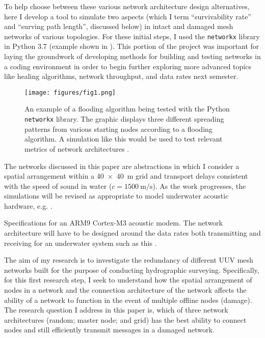 \documentclass[twocolumn,10pt]{IEEEtran}
\begin{document}
To help choose between these various network architecture design alternatives, here I develop a tool to simulate two aspects (which I term ``survivability rate'' and ``surving path length'', discussed below) in intact and damaged mesh networks of various topologies. For these initial steps, I used the \lstinline{networkx} library \cite{hagberg2008exploring, sphyce2015networkx} in Python 3.7 (example shown in ).  This portion of the project was important for laying the groundwork of developing methods for building and testing networks in a coding environment in order to begin further exploring more advanced topics like healing algorithms, network throughput, and data rates next semester. 
\begin{figure}[h]
\begin{center}
\texttt{[image: figures/fig1.png]}
\end{center}
\caption{An example of a flooding algorithm being tested with the Python \lstinline{networkx} library. The graphic displays three different spreading patterns from various starting nodes according to a flooding algorithm. A simulation like this would be used to test relevant metrics of network architectures \cite{sphyce2015networkx}.}
\label{fig:2}
\end{figure}

The networks discussed in this paper are abstractions in which I consider a spatial arrangement within a \SI{40x40}{\meter} grid and transport delays consistent with the speed of sound in water ($c=\SI{1500}{\meter\per\second}$). As the work progresses, the simulations will be revised as appropriate to model underwater acoustic hardware, e.g. .
\begin{table}[h]
\caption{Specifications for an ARM9 Cortex-M3 acoustic modem. The network architecture will have to be designed around the data rates both transmitting and receiving for an underwater system such as this \cite{arm2013acoustic}.}
\label{tab:1}
\begin{center}

\end{center}
\end{table}

The aim of my research is to investigate the redundancy of different UUV mesh networks built for the purpose of conducting hydrographic surveying. Specifically, for this first research step, I seek to understand how the spatial arrangement of nodes in a network and the connection architecture of the network affects the ability of a network to function in the event of multiple offline nodes (damage). The research question I address in this paper is, which of three network architectures (random; master node; and grid) has the best ability to connect nodes and still efficiently transmit messages in a damaged network.  
\end{document}
